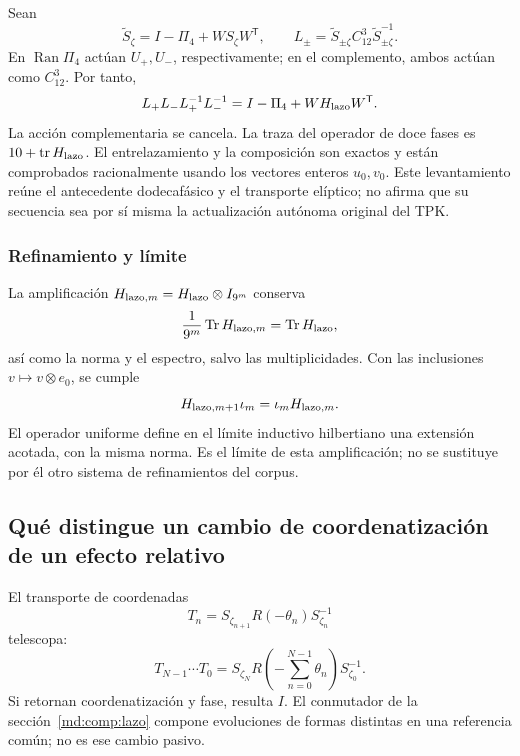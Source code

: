 Sean
\[
 \widetilde S_\zeta=I-\Pi_4+WS_\zeta W^{\mathsf T},\qquad
 L_\pm=\widetilde S_{\pm\zeta}C_{12}^3
       \widetilde S_{\pm\zeta}^{-1}.
\]
En \(\operatorname{Ran}\Pi_4\) actúan \(U_+,U_-\), respectivamente;
en el complemento, ambos actúan como \(C_{12}^3\). Por tanto,
\begin{equation}
 L_+L_-L_+^{-1}L_-^{-1}
 =I-\Pi_4+WH_{\rm lazo}W^{\mathsf T}.
 \label{md:comp:levantamiento-lazo}
\end{equation}
La acción complementaria se cancela. La traza del operador de doce
fases es \(10+\operatorname{tr}H_{\rm lazo}\).
El entrelazamiento y la composición son exactos y están comprobados
racionalmente usando los vectores enteros \(u_0,v_0\).
Este levantamiento reúne el antecedente dodecafásico y el transporte
elíptico; no afirma que su secuencia sea por sí misma la actualización
autónoma original del TPK.

\subsubsection{Refinamiento y límite}
\label{md:comp:limite}

La amplificación
\(H_{{\rm lazo},m}=H_{\rm lazo}\otimes I_{9^m}\) conserva
\[
 \frac{1}{9^m}\operatorname{Tr}H_{{\rm lazo},m}
 =\operatorname{Tr}H_{\rm lazo},
\]
así como la norma y el espectro, salvo las multiplicidades.
Con las inclusiones \(v\mapsto v\otimes e_0\), se cumple
\[
 H_{{\rm lazo},m+1}\iota_m=\iota_m H_{{\rm lazo},m}.
\]
El operador uniforme define en el límite inductivo hilbertiano una
extensión acotada, con la misma norma. Es el límite de esta
amplificación; no se sustituye por él otro sistema de refinamientos
del corpus.

\subsection{Qué distingue un cambio de coordenatización de un efecto relativo}
\label{md:comp:carta-efecto}

El transporte de coordenadas
\[
 T_n=S_{\zeta_{n+1}}R(-\theta_n)S_{\zeta_n}^{-1}
\]
telescopa:
\begin{equation}
 T_{N-1}\cdots T_0
 =S_{\zeta_N}R\left(-\sum_{n=0}^{N-1}\theta_n\right)
 S_{\zeta_0}^{-1}.
 \label{md:comp:telescopaje}
\end{equation}
Si retornan coordenatización y fase, resulta \(I\). El conmutador de la
sección~\ref{md:comp:lazo} compone evoluciones de formas distintas
en una referencia común; no es ese cambio pasivo.

